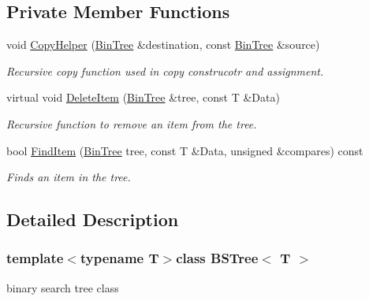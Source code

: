 \subsection*{Private Member Functions}
\begin{DoxyCompactItemize}
\item 
void \hyperlink{classBSTree_ab62ef6fa7acb74aefd5177977aeb4636}{Copy\-Helper} (\hyperlink{classBSTree_ae961195e523a45be64a981840e953b67}{Bin\-Tree} \&destination, const \hyperlink{classBSTree_ae961195e523a45be64a981840e953b67}{Bin\-Tree} \&source)
\begin{DoxyCompactList}\small\item\em Recursive copy function used in copy construcotr and assignment. \end{DoxyCompactList}\item 
virtual void \hyperlink{classBSTree_acce425c45a5c61fd887627740d123d0d}{Delete\-Item} (\hyperlink{classBSTree_ae961195e523a45be64a981840e953b67}{Bin\-Tree} \&tree, const T \&Data)
\begin{DoxyCompactList}\small\item\em Recursive function to remove an item from the tree. \end{DoxyCompactList}\item 
bool \hyperlink{classBSTree_a2ff8b3553c3ae8f6aeadab1598ca22d3}{Find\-Item} (\hyperlink{classBSTree_ae961195e523a45be64a981840e953b67}{Bin\-Tree} tree, const T \&Data, unsigned \&compares) const 
\begin{DoxyCompactList}\small\item\em Finds an item in the tree. \end{DoxyCompactList}\end{DoxyCompactItemize}


\subsection{Detailed Description}
\subsubsection*{template$<$typename T$>$class B\-S\-Tree$<$ T $>$}

binary search tree class 

